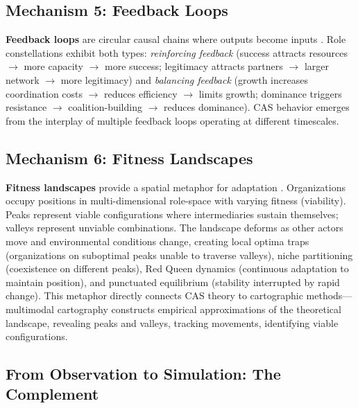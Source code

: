 \documentclass[../main.tex]{subfiles}
\begin{document}
\subsection{Mechanism 5: Feedback Loops}

\textbf{Feedback loops} are circular causal chains where outputs become inputs \cite{sterman2000business}. Role constellations exhibit both types: \textit{reinforcing feedback} (success attracts resources $\rightarrow$ more capacity $\rightarrow$ more success; legitimacy attracts partners $\rightarrow$ larger network $\rightarrow$ more legitimacy) and \textit{balancing feedback} (growth increases coordination costs $\rightarrow$ reduces efficiency $\rightarrow$ limits growth; dominance triggers resistance $\rightarrow$ coalition-building $\rightarrow$ reduces dominance). CAS behavior emerges from the interplay of multiple feedback loops operating at different timescales.

\subsection{Mechanism 6: Fitness Landscapes}

\textbf{Fitness landscapes} provide a spatial metaphor for adaptation \cite{kauffman1993origins}. Organizations occupy positions in multi-dimensional role-space with varying fitness (viability). Peaks represent viable configurations where intermediaries sustain themselves; valleys represent unviable combinations. The landscape deforms as other actors move and environmental conditions change, creating local optima traps (organizations on suboptimal peaks unable to traverse valleys), niche partitioning (coexistence on different peaks), Red Queen dynamics \cite{valen1973red} (continuous adaptation to maintain position), and punctuated equilibrium \cite{eldredge1972punctuated} (stability interrupted by rapid change). This metaphor directly connects CAS theory to cartographic methods---multimodal cartography constructs empirical approximations of the theoretical landscape, revealing peaks and valleys, tracking movements, identifying viable configurations.

\subsection{From Observation to Simulation: The \RoleSim Complement}
\end{document}
